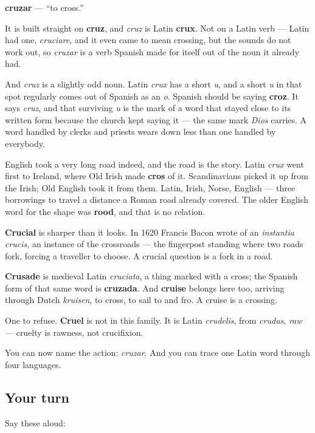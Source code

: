 \begin{cousinweb}
\textbf{cruzar} — \textquotedblleft{}to cross.\textquotedblright{}

It is built straight on \textbf{cruz}, and \emph{cruz} is Latin \textbf{crux}. Not on a Latin verb — Latin had one, \emph{cruciare}, and it even came to mean crossing, but the sounds do not work out, so \emph{cruzar} is a verb Spanish made for itself out of the noun it already had.

And \emph{cruz} is a slightly odd noun. Latin \emph{crux} has a short \emph{u}, and a short \emph{u} in that spot regularly comes out of Spanish as an \emph{o}. Spanish should be saying \textbf{croz}. It says \emph{cruz}, and that surviving \emph{u} is the mark of a word that stayed close to its written form because the church kept saying it — the same mark \emph{Dios} carries. A word handled by clerks and priests wears down less than one handled by everybody.

English took a very long road indeed, and the road is the story. Latin \emph{crux} went first to Ireland, where Old Irish made \textbf{cros} of it. Scandinavians picked it up from the Irish; Old English took it from them. Latin, Irish, Norse, English — three borrowings to travel a distance a Roman road already covered. The older English word for the shape was \textbf{rood}, and that is no relation.

\textbf{Crucial} is sharper than it looks. In 1620 Francis Bacon wrote of an \emph{instantia crucis}, an instance of the crossroads — the fingerpost standing where two roads fork, forcing a traveller to choose. A crucial question is a fork in a road.

\textbf{Crusade} is medieval Latin \emph{cruciata}, a thing marked with a cross; the Spanish form of that same word is \textbf{cruzada}. And \textbf{cruise} belongs here too, arriving through Dutch \emph{kruisen}, to cross, to sail to and fro. A cruise is a crossing.

One to refuse. \textbf{Cruel} is not in this family. It is Latin \emph{crudelis}, from \emph{crudus}, \emph{raw} — cruelty is rawness, not crucifixion.
\end{cousinweb}

\begin{grammarlens}[title={What you've built}]
You can now name the action: \emph{cruzar}. And you can trace one Latin word through four languages.
\end{grammarlens}

\subsection*{Your turn}
Say these aloud:

